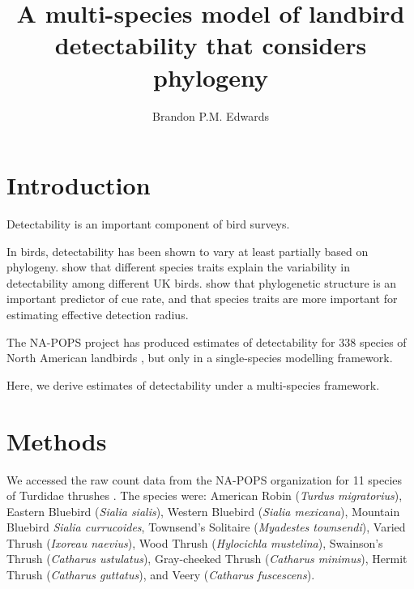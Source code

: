 \documentclass[]{article}
\title{A multi-species model of landbird detectability that considers phylogeny}
\author{Brandon P.M. Edwards}
\begin{document}
\maketitle

\begin{abstract}

\end{abstract}

\section{Introduction}

\par Detectability is an important component of bird surveys.

\par In birds, detectability has been shown to vary at least partially based on phylogeny. \citet{johnston_species_2014} show that different species traits explain the variability in detectability among different UK birds. \citet{solymos_phylogeny_2018} show that phylogenetic structure is an important predictor of cue rate, and that species traits are more important for estimating effective detection radius.

\par The NA-POPS project has produced estimates of detectability for 338 species of North American landbirds \citep{edwards_point_nodate}, but only in a single-species modelling framework.

\par Here, we derive estimates of detectability under a multi-species framework.

\section{Methods}

\par We accessed the raw count data from the NA-POPS organization for 11 species of Turdidae thrushes \citep{edwards_point_nodate}. The species were: American Robin (\textit{Turdus migratorius}), Eastern Bluebird (\textit{Sialia sialis}), Western Bluebird (\textit{Sialia mexicana}), Mountain Bluebird \textit{Sialia currucoides}, Townsend's Solitaire (\textit{Myadestes townsendi}), Varied Thrush (\textit{Ixoreau naevius}), Wood Thrush (\textit{Hylocichla mustelina}), Swainson's Thrush (\textit{Catharus ustulatus}), Gray-cheeked Thrush (\textit{Catharus minimus}), Hermit Thrush (\textit{Catharus guttatus}), and Veery (\textit{Catharus fuscescens}).  
\end{document}
